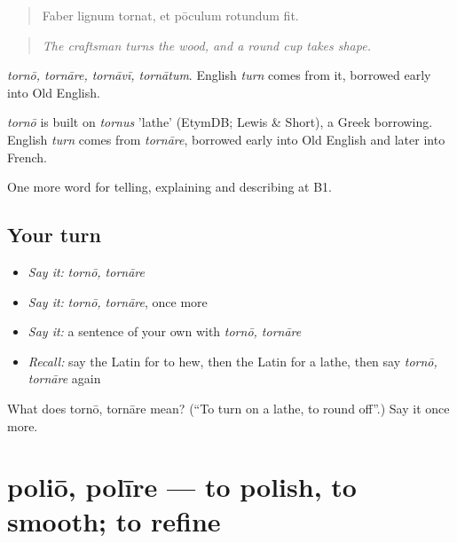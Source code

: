 \begin{quote}
Faber lignum tornat, et pōculum rotundum fit.
\end{quote}

\begin{quote}
\emph{The craftsman turns the wood, and a round cup takes shape.}
\end{quote}

\emph{tornō, tornāre, tornāvī, tornātum}. English \emph{turn} comes from it, borrowed early into Old English.

\begin{cousinweb}
\emph{tornō} is built on \emph{tornus} 'lathe' (EtymDB; Lewis \& Short), a Greek borrowing. English \emph{turn} comes from \emph{tornāre}, borrowed early into Old English and later into French.
\end{cousinweb}

\begin{grammarlens}[title={What you've built}]
One more word for telling, explaining and describing at B1.
\end{grammarlens}

\subsection*{Your turn}
\begin{itemize}
\raggedright
  \item \emph{Say it:} \emph{tornō, tornāre}
  \item \emph{Say it:} \emph{tornō, tornāre}, once more
  \item \emph{Say it:} a sentence of your own with \emph{tornō, tornāre}
  \item \emph{Recall:} say the Latin for to hew, then the Latin for a lathe, then say \emph{tornō, tornāre} again
\end{itemize}

\begin{tcolorbox}[breakable,colback=teal!4,colframe=teal!35!black,title={Before you move on}]
What does tornō, tornāre mean? (\textquotedblleft{}To turn on a lathe, to round off\textquotedblright{}.) Say it once more.
\end{tcolorbox}
\section[poliō, polīre]{poliō, polīre — to polish, to smooth; to refine}

\label{lesson:LA-C471-polio}



